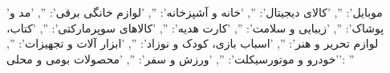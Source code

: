﻿{'موبایل': '', 'کالای دیجیتال': '', 'خانه و آشپزخانه': '', 'لوازم خانگی برقی': '', 'مد و پوشاک': '', 'زیبایی و سلامت': '', 'کارت هدیه': '', 'کالاهای سوپرمارکتی': '', 'کتاب، لوازم تحریر و هنر': '', 'اسباب بازی، کودک و نوزاد': '', 'ابزار آلات و تجهیزات': '', 'خودرو و موتورسیکلت': '', 'ورزش و سفر': '', 'محصولات بومی و محلی': ''}